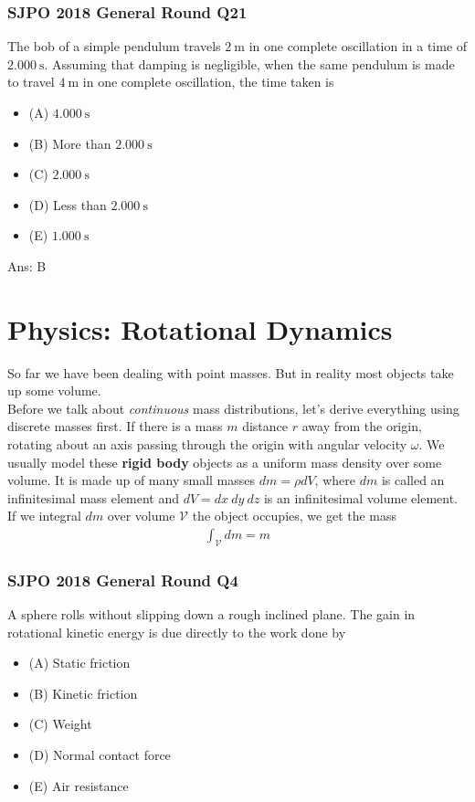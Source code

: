 \documentclass{article}
\begin{document}
\begin{samepage}
\subsubsection{SJPO 2018 General Round Q21}
The bob of a simple pendulum travels $2 \mathrm{~m}$ in one complete oscillation in a time of $2.000 \mathrm{~s}$. Assuming that damping is negligible, when the same pendulum is made to travel $4 \mathrm{~m}$ in one complete oscillation, the time taken is
\begin{itemize}
\item[](A) $4.000 \mathrm{~s}$
\item[](B) More than $2.000 \mathrm{~s}$
\item[](C) $2.000 \mathrm{~s}$
\item[](D) Less than $2.000 \mathrm{~s}$
\item[](E) $1.000 \mathrm{~s}$
\end{itemize}
Ans: \ifpaper B \fi 
\end{samepage}


\section{Physics: Rotational Dynamics}
So far we have been dealing with point masses. But in reality most objects take up some volume. \\[10pt]
Before we talk about \textit{continuous} mass distributions, let's derive everything using discrete masses first. If there is a mass $m$ distance $r$ away from the origin, rotating about an axis passing through the origin with angular velocity $\omega$.
We usually model these \textbf{rigid body} objects as a uniform mass density over some volume. It is made up of many small masses $dm = \rho dV$, where $dm$ is called an infinitesimal mass element and $dV = dx\ dy\ dz$ is an infinitesimal volume element. If we integral $dm$ over volume $\mathcal{V}$ the object occupies, we get the mass
\begin{align}
    \int_{\mathcal V} dm = m
\end{align}

\subsubsection{SJPO 2018 General Round Q4}
A sphere rolls without slipping down a rough inclined plane. The gain in rotational kinetic energy is due directly to the work done by
\begin{itemize}
\item[](A) Static friction
\item[](B) Kinetic friction
\item[](C) Weight
\item[](D) Normal contact force
\item[](E) Air resistance
\end{itemize}
\end{document}
